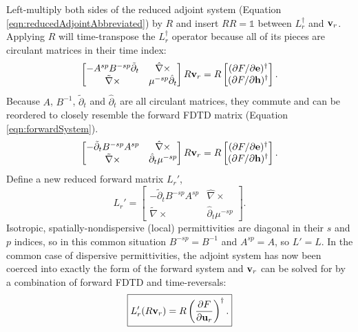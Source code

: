 Left-multiply both sides of the reduced adjoint system (Equation \ref{eqn:reducedAdjointAbbreviated}) by $R$ and insert $RR = \mathbb{1}$ between $L_r^\dagger$ and $\textbf{v}_r$.  Applying $R$ will time-transpose the $L_r^\dagger$ operator because all of its pieces are circulant matrices in their time index:
%
\begin{equation}
\begin{bmatrix}
-A^{sp} B^{-sp} \tilde{\partial}_t & \hat{\nabla} \times \\
\tilde{\nabla} \times & \mu^{-sp} \hat{\partial}_t
\end{bmatrix}
R \textbf{v}_r
=
R
\begin{bmatrix}
(\partial{F}/\partial{\textbf{e}})^\dagger \\
(\partial{F}/\partial{\textbf{h}})^\dagger
\end{bmatrix}.
\end{equation}
%
Because $A$, $B^{-1}$, $\tilde{\partial}_t$ and $\hat{\partial}_t$ are all circulant matrices, they commute and can be reordered to closely resemble the forward FDTD matrix (Equation \ref{eqn:forwardSystem}).
%
\begin{equation}
\begin{bmatrix}
-\tilde{\partial}_t B^{-sp} A^{sp} & \hat{\nabla} \times \\
\tilde{\nabla} \times & \hat{\partial}_t \mu^{-sp} 
\end{bmatrix}
R \textbf{v}_r
=
R
\begin{bmatrix}
(\partial{F}/\partial{\textbf{e}})^\dagger \\
(\partial{F}/\partial{\textbf{h}})^\dagger
\end{bmatrix}.
\end{equation}
%
Define a new reduced forward matrix $L_r'$,
%
\begin{equation}
L_r' = 
\begin{bmatrix}
-\tilde{\partial}_t B^{-sp} A^{sp} & \hat{\nabla} \times \\
\tilde{\nabla} \times & \hat{\partial}_t \mu^{-sp} 
\end{bmatrix}.
\end{equation}
%
Isotropic, spatially-nondispersive (local) permittivities are diagonal in their $s$ and $p$ indices, so in this common situation $B^{-sp} = B^{-1}$ and $A^{sp} = A$, so $L' = L$.  In the common case of dispersive permittivities, the adjoint system has now been coerced into exactly the form of the forward system and $\textbf{v}_r$ can be solved for by a combination of forward FDTD and time-reversals:
%
\begin{equation}
\boxed{
L_r' (R \ve{v}_r) = R \left(\pp{F}{\ve u_r}\right)^\dagger.
}%
\label{eqn:adjointAsForward}
\end{equation}
%

